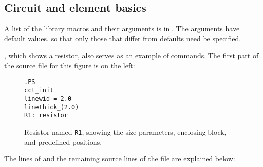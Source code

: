 \subsection{Circuit and element basics\label{Basics:}}
A list of the library macros and their arguments is in
.  The arguments have default values, so that only
those that differ from defaults need be specified.

, which shows a resistor, also serves as
an example of \pic commands.
The first part of the source file for this figure is 
on the left:

\begin{figure}[hbt]
   \parbox{2in}{\tt .PS\\ \hbox{}\quad cct\_init\\ \hbox{}\quad linewid = 2.0\\ 
     \hbox{}\quad linethick\_(2.0)\\ R1: resistor}
   \raisebox{-0.3in}{\hbox{}}
   \caption{Resistor named {\tt R1}, showing the size parameters,
     enclosing block, and predefined positions.}
   \label{BigResistor}
   \end{figure}
The lines of 
and the remaining source lines of the file are explained below:
